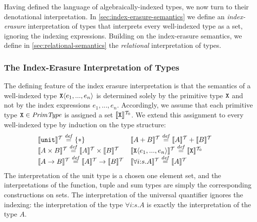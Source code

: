 Having defined the language of algebraically-indexed types, we now
turn to their denotational interpretation. In
\autoref{sec:index-erasure-semantics} we define an
\emph{index-erasure} interpretation of types that interprets every
well-indexed type as a set, ignoring the indexing expressions. Building on
the index-erasure semantics, we define in
\autoref{sec:relational-semantics} the \emph{relational}
interpretation of types.


\subsubsection{The Index-Erasure Interpretation of Types}
\label{sec:index-erasure-semantics}

The defining feature of the index erasure interpretation is that the
semantics of a well-indexed type $\texttt{X}\langle e_1,...,e_n \rangle$ is
determined solely by the primitive type $\texttt{X}$ and not by the
index expressions $e_1,...,e_n$. Accordingly, we assume that each
primitive type $\texttt{X} \in \mathit{PrimType}$ is assigned a set
$\llbracket \texttt{X} \rrbracket^{\mathcal{T}_0}$. We extend this assignment to every
well-indexed type by induction on the type structure:
\begin{displaymath}
  \begin{array}{@{\hspace{0em}}c@{\hspace{0em}}c}
    \begin{array}{@{}l}
      \tySem{\tyUnit} \isDefinedAs \{*\} \\
      \tySem{A \tyProduct B} \isDefinedAs \tySem{A} \times \tySem{B} \\
      \tySem{A \tyArr B} \isDefinedAs \tySem{A} \to \tySem{B} \\
    \end{array}
    &
    \begin{array}{l}
      \tySem{A + B} \isDefinedAs \tySem{A} + \tySem{B} \\
      \tySem{\tyPrim{X}{e_1,...,e_n}} \isDefinedAs \tyPrimSem{\tyPrimNm{X}} \\
      \tySem{\forall i\mathord:s. A} \isDefinedAs \tySem{A}
    \end{array}
  \end{array}
\end{displaymath}
The interpretation of the unit type is a chosen one element set, and
the interpretations of the function, tuple and sum types are simply
the corresponding constructions on sets. The interpretation of the
universal quantifier ignores the indexing: the interpretation of the
type $\forall i\mathord:s.A$ is exactly the interpretation of the type
$A$.

